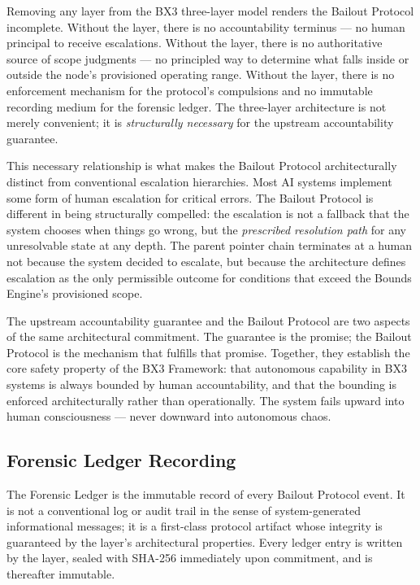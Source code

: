 Removing any layer from the BX3 three-layer model renders the Bailout Protocol incomplete. Without the \purpose{} layer, there is no accountability terminus --- no human principal to receive escalations. Without the \bounds{} layer, there is no authoritative source of scope judgments --- no principled way to determine what falls inside or outside the node's provisioned operating range. Without the \fact{} layer, there is no enforcement mechanism for the protocol's compulsions and no immutable recording medium for the forensic ledger. The three-layer architecture is not merely convenient; it is \emph{structurally necessary} for the upstream accountability guarantee.

This necessary relationship is what makes the Bailout Protocol architecturally distinct from conventional escalation hierarchies. Most AI systems implement some form of human escalation for critical errors. The Bailout Protocol is different in being structurally compelled: the escalation is not a fallback that the system chooses when things go wrong, but the \emph{prescribed resolution path} for any unresolvable state at any depth. The parent pointer chain terminates at a human not because the system decided to escalate, but because the architecture defines escalation as the only permissible outcome for conditions that exceed the Bounds Engine's provisioned scope.

The upstream accountability guarantee and the Bailout Protocol are two aspects of the same architectural commitment. The guarantee is the promise; the Bailout Protocol is the mechanism that fulfills that promise. Together, they establish the core safety property of the BX3 Framework: that autonomous capability in BX3 systems is always bounded by human accountability, and that the bounding is enforced architecturally rather than operationally. The system fails upward into human consciousness --- never downward into autonomous chaos.

\subsection{Forensic Ledger Recording}
\label{sec:forensic-ledger}

The Forensic Ledger is the immutable record of every Bailout Protocol event. It is not a conventional log or audit trail in the sense of system-generated informational messages; it is a first-class protocol artifact whose integrity is guaranteed by the \fact{} layer's architectural properties. Every ledger entry is written by the \fact{} layer, sealed with SHA-256 immediately upon commitment, and is thereafter immutable.

